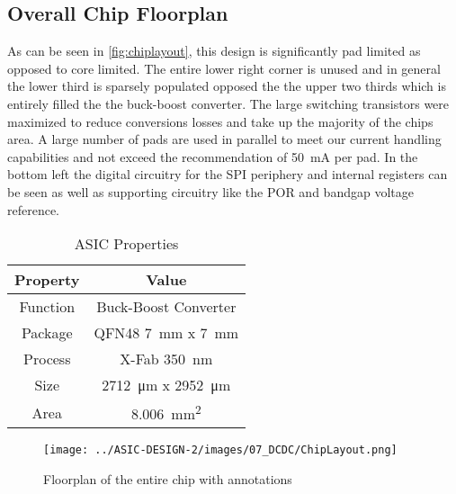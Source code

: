 \subsection{Overall Chip Floorplan}
As can be seen in \autoref{fig:chiplayout}, this design is significantly pad limited as opposed to core limited. The entire lower right corner is unused and in general the lower third is sparsely populated opposed the the upper two thirds which is entirely filled the the buck-boost converter. The large switching transistors were maximized to reduce conversions losses and take up the majority of the chips area. A large number of pads are used in parallel to meet our current handling capabilities and not exceed the recommendation of \qty{50}{\milli\ampere} per pad. In the bottom left the digital circuitry for the \ac{SPI} periphery and internal registers can be seen as well as supporting circuitry like the \ac{POR} and bandgap voltage reference. 
\begin{table}[H]
    \centering
    \begin{tabular}{|c|c|}
        Property & Value \\
        \hline
        Function & Buck-Boost Converter \\
        Package & QFN48 \qty{7}{\milli\meter} x \qty{7}{\milli\meter} \\
        Process & X-Fab \qty{350}{\nano\meter} \\
		Size & \qty{2712}{\micro\meter} x \qty{2952}{\micro\meter} \\
        Area & \qty{8.006}{\milli\meter\squared}
    \end{tabular}
    \caption{ASIC Properties}
    \label{tab:spec_asic}
\end{table}
\begin{figure}[h]
    \centering
    \texttt{[image: ../ASIC-DESIGN-2/images/07\_DCDC/ChipLayout.png]}
    \caption{Floorplan of the entire chip with annotations}
    \label{fig:chiplayout}
\end{figure}

